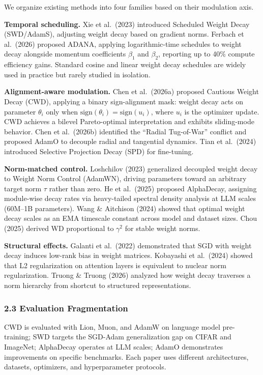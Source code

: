 \documentclass[
]{article}
\begin{document}
We organize existing methods into four families based on their
modulation axis.

\textbf{Temporal scheduling.} Xie et al.~(2023) introduced Scheduled
Weight Decay (SWD/AdamS), adjusting weight decay based on gradient
norms. Ferbach et al.~(2026) proposed ADANA, applying logarithmic-time
schedules to weight decay alongside momentum coefficients \(\beta_1\)
and \(\beta_2\), reporting up to 40\% compute efficiency gains. Standard
cosine and linear weight decay schedules are widely used in practice but
rarely studied in isolation.

\textbf{Alignment-aware modulation.} Chen et al.~(2026a) proposed
Cautious Weight Decay (CWD), applying a binary sign-alignment mask:
weight decay acts on parameter \(\theta_i\) only when
\(\mathrm{sign}(\theta_i) = \mathrm{sign}(u_i)\), where \(u_i\) is the
optimizer update. CWD achieves a bilevel Pareto-optimal interpretation
and exhibits sliding-mode behavior. Chen et al.~(2026b) identified the
``Radial Tug-of-War'' conflict and proposed AdamO to decouple radial and
tangential dynamics. Tian et al.~(2024) introduced Selective Projection
Decay (SPD) for fine-tuning.

\textbf{Norm-matched control.} Loshchilov (2023) generalized decoupled
weight decay to Weight Norm Control (AdamWN), driving parameters toward
an arbitrary target norm \(\tau\) rather than zero. He et al.~(2025)
proposed AlphaDecay, assigning module-wise decay rates via heavy-tailed
spectral density analysis at LLM scales (60M--1B parameters). Wang \&
Aitchison (2024) showed that optimal weight decay scales as an EMA
timescale constant across model and dataset sizes. Chou (2025) derived
WD proportional to \(\gamma^2\) for stable weight norms.

\textbf{Structural effects.} Galanti et al.~(2022) demonstrated that SGD
with weight decay induces low-rank bias in weight matrices. Kobayashi et
al.~(2024) showed that L2 regularization on attention layers is
equivalent to nuclear norm regularization. Truong \& Truong (2026)
analyzed how weight decay traverses a norm hierarchy from shortcut to
structured representations.

\hypertarget{evaluation-fragmentation}{%
\subsubsection{2.3 Evaluation
Fragmentation}\label{evaluation-fragmentation}}

CWD is evaluated with Lion, Muon, and AdamW on language model
pre-training; SWD targets the SGD-Adam generalization gap on CIFAR and
ImageNet; AlphaDecay operates at LLM scales; AdamO demonstrates
improvements on specific benchmarks. Each paper uses different
architectures, datasets, optimizers, and hyperparameter protocols.
\end{document}
